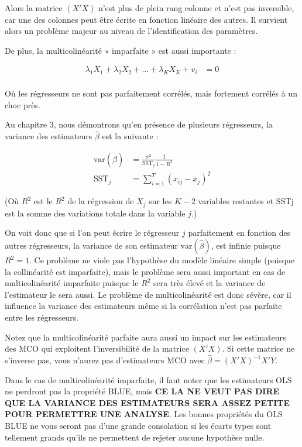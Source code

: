 \documentclass[14pt]{extarticle} %
\theoremstyle{definition}
\theoremstyle{plain}
\begin{document}
Alors la matrice $(X'X)$ n’est plus de plein rang colonne et n’est pas inversible, car une des colonnes peut être écrite en fonction linéaire des autres. Il survient alors un problème majeur au niveau de l’identification des paramètres.

De plus, la multicolinéarité « imparfaite » est aussi importante :

\begin{align*}
\lambda_1 X_1 + \lambda_2 X_2 + \dots + \lambda_K X_K + v_i &= 0 \\
\end{align*}

Où les régresseurs ne sont pas parfaitement corrélés, mais fortement corrélés à un choc près.

Au chapitre 3, nous démontrons qu’en présence de plusieurs régresseurs, la variance des estimateurs $\hat{\beta}$ est la suivante :

\begin{align*}
\text{var}(\hat{\beta}) &= \frac{\sigma^2}{\text{SST}_j} \frac{1}{1 - R^2} \\
\text{SST}_j &= \sum_{i=1}^{T} (x_{ij} - \bar{x}_j)^2
\end{align*}

(Où $R^2$ est le $R^2$ de la régression de $X_j$ sur les $K-2$ variables restantes et SSTj est la somme des variations totale dans la variable $j$.)

On voit donc que si l’on peut écrire le régresseur $j$ parfaitement en fonction des autres régresseurs, la variance de son estimateur $\text{var}(\hat{\beta})$, est infinie puisque $R^2 = 1$. Ce problème ne viole pas l'hypothèse du modèle linéaire simple (puisque la collinéarité est imparfaite), mais le problème sera aussi important en cas de multicolinéarité imparfaite puisque le $R^2$ sera très élevé et la variance de l’estimateur le sera aussi. Le problème de multicolinéarité est donc sévère, car il influence la variance des estimateurs même si la corrélation n’est pas parfaite entre les régresseurs.

Notez que la multicolinéarité parfaite aura aussi un impact sur les estimateurs des MCO qui exploitent l’inversibilité de la matrice $(X'X)$. Si cette matrice ne s’inverse pas, vous n’aurez pas d’estimateurs MCO avec $\hat{\beta} = (X'X)^{-1}X'Y$.

Dans le cas de multicolinéarité imparfaite, il faut noter que les estimateurs OLS ne perdront pas la propriété BLUE, mais \textbf{CE LA NE VEUT PAS DIRE QUE LA VARIANCE DES ESTIMATEURS SERA ASSEZ PETITE POUR PERMETTRE UNE ANALYSE}. Les bonnes propriétés du OLS BLUE ne vous seront pas d’une grande consolation si les écarts types sont tellement grands qu’ils ne permettent de rejeter aucune hypothèse nulle.
\end{document}
